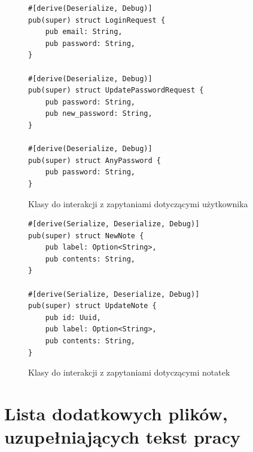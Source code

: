 \documentclass[a4paper,twoside,12pt]{book}
\begin{document}
\begin{appendices}
\begin{figure}[H]
\begin{lstlisting}
#[derive(Deserialize, Debug)]
pub(super) struct LoginRequest {
    pub email: String,
    pub password: String,
}

#[derive(Deserialize, Debug)]
pub(super) struct UpdatePasswordRequest {
    pub password: String,
    pub new_password: String,
}

#[derive(Deserialize, Debug)]
pub(super) struct AnyPassword {
    pub password: String,
}
\end{lstlisting}
\caption{Klasy do interakcji z zapytaniami dotyczącymi użytkownika}
\label{fig:pseudokod:klasa-interact-user}
\end{figure}

\begin{figure}[H]
\centering
\begin{lstlisting}
#[derive(Serialize, Deserialize, Debug)]
pub(super) struct NewNote {
    pub label: Option<String>,
    pub contents: String,
}

#[derive(Serialize, Deserialize, Debug)]
pub(super) struct UpdateNote {
    pub id: Uuid,
    pub label: Option<String>,
    pub contents: String,
}
\end{lstlisting}
\caption{Klasy do interakcji z zapytaniami dotyczącymi notatek}
\label{fig:pseudokod:klasa-interact-note}
\end{figure}




\chapter{Lista dodatkowych plików, uzupełniających tekst pracy} 


\end{appendices}
\end{document}
